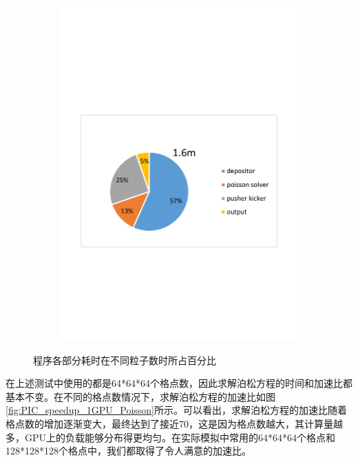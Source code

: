 \begin{figure}[!htb]
\begin{subfigure}[b]{0.75\textwidth}
        \includegraphics[width=\textwidth]{Img/PIC_speedup_1GPU_percentage3.pdf}
    \end{subfigure}
    \caption{程序各部分耗时在不同粒子数时所占百分比}\label{fig:PIC_speedup_1GPU_percentage}
\end{figure}

在上述测试中使用的都是64*64*64个格点数，因此求解泊松方程的时间和加速比都基本不变。在不同的格点数情况下，求解泊松方程的加速比如图\ref{fig:PIC_speedup_1GPU_Poisson}所示。可以看出，求解泊松方程的加速比随着格点数的增加逐渐变大，最终达到了接近70，这是因为格点数越大，其计算量越多，GPU上的负载能够分布得更均匀。在实际模拟中常用的64*64*64个格点和128*128*128个格点中，我们都取得了令人满意的加速比。

